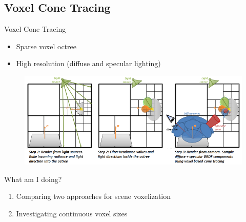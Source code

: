 \documentclass[10pt]{beamer}
\begin{document}
\subsection{Voxel Cone Tracing}
\begin{frame}{Voxel Cone Tracing}

  \begin{itemize}
    \item Sparse voxel octree %
    \item High resolution (diffuse and specular lighting)
  \end{itemize}

  \begin{figure}
    \includegraphics[width=\textwidth]{vct.png}
  \end{figure}
\end{frame}


\begin{frame}{What am I doing?} %
  \begin{enumerate}
    \item Comparing two approaches for scene voxelization %
    \item Investigating continuous voxel sizes %
  \end{enumerate}
\end{frame}
\end{document}

